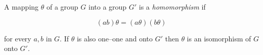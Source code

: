 A mapping $\theta$ of a group $G$ into a group $G'$ is a \textit{homomorphism} if

$$(ab)\theta = (a\theta)(b\theta)$$

for every $a, b$ in $G$. If $\theta$ is also one--one and onto $G'$ then $\theta$ is an isomorphism of $G$ onto $G'$.

